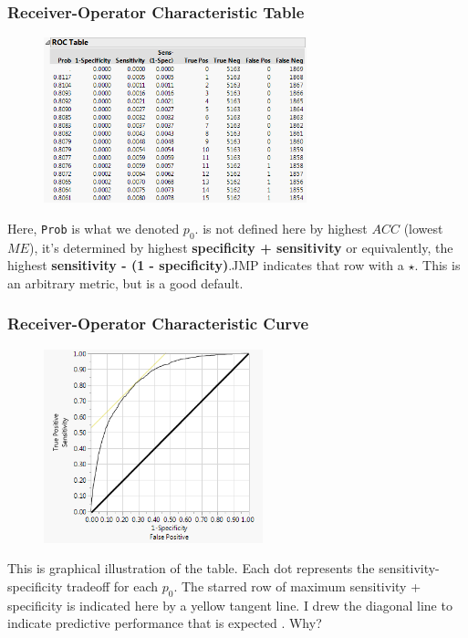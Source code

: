 \documentclass[handout]{beamer}
\begin{document}
\begin{frame}\frametitle{Receiver-Operator Characteristic Table}

\begin{figure}
\centering
\hspace{-0.5cm}\includegraphics[width=3.0in]{roc_table.png}
\end{figure}

\vspace{-0.3cm}
Here, \texttt{Prob} is what we denoted $p_0$.  is not defined here by highest $ACC$ (lowest $ME$), it's determined by highest \textbf{specificity + sensitivity} or equivalently, the highest \textbf{sensitivity - (1 - specificity)}.JMP indicates that row with a $\star$. This is an arbitrary metric, but is a good default.

\end{frame}

\begin{frame}\frametitle{Receiver-Operator Characteristic Curve}

\vspace{-0.2cm}
\begin{figure}
\centering
\hspace{-0.5cm}\includegraphics[width=2.5in]{roc_curve.png}
\end{figure}

\small
\vspace{-0.3cm}
This is graphical illustration of the table. Each dot represents the sensitivity-specificity tradeoff for each $p_0$. \pause The starred row of maximum sensitivity + specificity is indicated here by a yellow tangent line. \pause I drew the diagonal line to indicate predictive performance that is expected . Why?

\end{frame}
\end{document}
